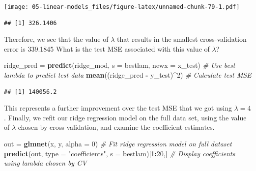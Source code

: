 \documentclass[
  openany]{book}
\newenvironment{Shaded}{\begin{snugshade}}{\end{snugshade}}
\newcommand{\CommentTok}[1]{\textcolor[rgb]{0.56,0.35,0.01}{\textit{#1}}}
\newcommand{\DataTypeTok}[1]{\textcolor[rgb]{0.13,0.29,0.53}{#1}}
\newcommand{\DecValTok}[1]{\textcolor[rgb]{0.00,0.00,0.81}{#1}}
\newcommand{\KeywordTok}[1]{\textcolor[rgb]{0.13,0.29,0.53}{\textbf{#1}}}
\newcommand{\NormalTok}[1]{#1}
\newcommand{\OperatorTok}[1]{\textcolor[rgb]{0.81,0.36,0.00}{\textbf{#1}}}
\newcommand{\StringTok}[1]{\textcolor[rgb]{0.31,0.60,0.02}{#1}}
\begin{document}
\texttt{[image: 05-linear-models\_files/figure-latex/unnamed-chunk-79-1.pdf]}

\begin{Shaded}
\end{Shaded}

\begin{verbatim}
## [1] 326.1406
\end{verbatim}

Therefore, we see that the value of \(\lambda\) that results in the smallest cross-validation
error is 339.1845 What is the test MSE associated with this value of
\(\lambda\)?

\begin{Shaded}
\begin{Highlighting}[]
\NormalTok{ridge_pred =}\StringTok{ }\KeywordTok{predict}\NormalTok{(ridge_mod, }\DataTypeTok{s =}\NormalTok{ bestlam, }\DataTypeTok{newx =}\NormalTok{ x_test) }\CommentTok{# Use best lambda to predict test data}
\KeywordTok{mean}\NormalTok{((ridge_pred }\OperatorTok{-}\StringTok{ }\NormalTok{y_test)}\OperatorTok{^}\DecValTok{2}\NormalTok{) }\CommentTok{# Calculate test MSE}
\end{Highlighting}
\end{Shaded}

\begin{verbatim}
## [1] 140056.2
\end{verbatim}

This represents a further improvement over the test MSE that we got using
\(\lambda = 4\). Finally, we refit our ridge regression model on the full data set,
using the value of \(\lambda\) chosen by cross-validation, and examine the coefficient
estimates.

\begin{Shaded}
\begin{Highlighting}[]
\NormalTok{out =}\StringTok{ }\KeywordTok{glmnet}\NormalTok{(x, y, }\DataTypeTok{alpha =} \DecValTok{0}\NormalTok{) }\CommentTok{# Fit ridge regression model on full dataset}
\KeywordTok{predict}\NormalTok{(out, }\DataTypeTok{type =} \StringTok{"coefficients"}\NormalTok{, }\DataTypeTok{s =}\NormalTok{ bestlam)[}\DecValTok{1}\OperatorTok{:}\DecValTok{20}\NormalTok{,] }\CommentTok{# Display coefficients using lambda chosen by CV}
\end{Highlighting}
\end{Shaded}
\end{document}
